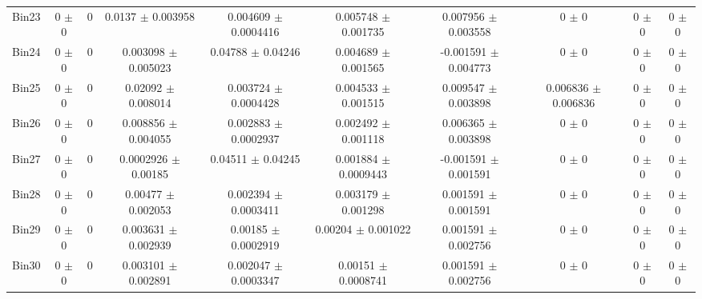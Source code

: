 \begin{tabular}{@{\extracolsep{4pt}}lccccccccc@{}}
     Bin23 & 0 $\pm$ 0 & 0 & 0.0137 $\pm$ 0.003958 & 0.004609 $\pm$ 0.0004416 & 0.005748 $\pm$ 0.001735 & 0.007956 $\pm$ 0.003558 & 0 $\pm$ 0 & 0 $\pm$ 0 & 0 $\pm$ 0 \\ 
     Bin24 & 0 $\pm$ 0 & 0 & 0.003098 $\pm$ 0.005023 & 0.04788 $\pm$ 0.04246 & 0.004689 $\pm$ 0.001565 & -0.001591 $\pm$ 0.004773 & 0 $\pm$ 0 & 0 $\pm$ 0 & 0 $\pm$ 0 \\ 
     Bin25 & 0 $\pm$ 0 & 0 & 0.02092 $\pm$ 0.008014 & 0.003724 $\pm$ 0.0004428 & 0.004533 $\pm$ 0.001515 & 0.009547 $\pm$ 0.003898 & 0.006836 $\pm$ 0.006836 & 0 $\pm$ 0 & 0 $\pm$ 0 \\ 
     Bin26 & 0 $\pm$ 0 & 0 & 0.008856 $\pm$ 0.004055 & 0.002883 $\pm$ 0.0002937 & 0.002492 $\pm$ 0.001118 & 0.006365 $\pm$ 0.003898 & 0 $\pm$ 0 & 0 $\pm$ 0 & 0 $\pm$ 0 \\ 
     Bin27 & 0 $\pm$ 0 & 0 & 0.0002926 $\pm$ 0.00185 & 0.04511 $\pm$ 0.04245 & 0.001884 $\pm$ 0.0009443 & -0.001591 $\pm$ 0.001591 & 0 $\pm$ 0 & 0 $\pm$ 0 & 0 $\pm$ 0 \\ 
     Bin28 & 0 $\pm$ 0 & 0 & 0.00477 $\pm$ 0.002053 & 0.002394 $\pm$ 0.0003411 & 0.003179 $\pm$ 0.001298 & 0.001591 $\pm$ 0.001591 & 0 $\pm$ 0 & 0 $\pm$ 0 & 0 $\pm$ 0 \\ 
     Bin29 & 0 $\pm$ 0 & 0 & 0.003631 $\pm$ 0.002939 & 0.00185 $\pm$ 0.0002919 & 0.00204 $\pm$ 0.001022 & 0.001591 $\pm$ 0.002756 & 0 $\pm$ 0 & 0 $\pm$ 0 & 0 $\pm$ 0 \\ 
     Bin30 & 0 $\pm$ 0 & 0 & 0.003101 $\pm$ 0.002891 & 0.002047 $\pm$ 0.0003347 & 0.00151 $\pm$ 0.0008741 & 0.001591 $\pm$ 0.002756 & 0 $\pm$ 0 & 0 $\pm$ 0 & 0 $\pm$ 0 \\ 
\hline\hline
  \end{tabular}
